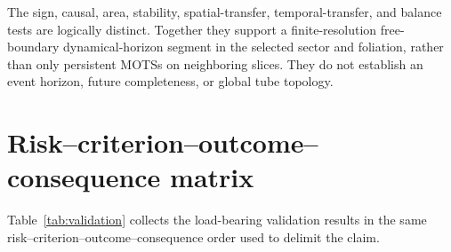 \documentclass[11pt]{article}
\begin{document}
The sign, causal, area, stability, spatial-transfer, temporal-transfer, and
balance tests are logically distinct.  Together they support a
finite-resolution free-boundary dynamical-horizon segment in the selected
sector and foliation, rather than only persistent MOTSs on neighboring slices.
They do not establish an event horizon, future completeness, or global tube
topology.

\section{Risk--criterion--outcome--consequence matrix}

Table~\ref{tab:validation} collects the load-bearing validation results in the
same risk--criterion--outcome--consequence order used to delimit the claim.
\end{document}
